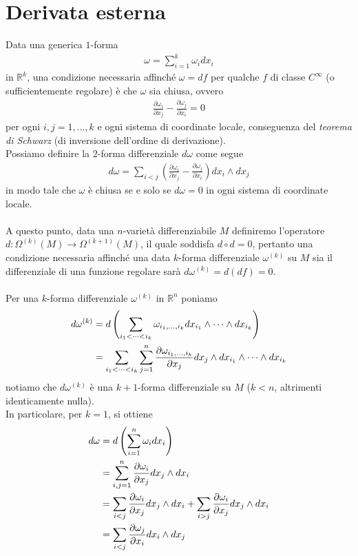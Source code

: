 \documentclass[twoside, 11pt]{amsbook}
\newcommand{\0}{{(0)}}
\newcommand{\3}{{(3)}}
\theoremstyle{colonplain}
\theoremstyle{colondefinition}
\theoremstyle{colonremark}
\numberwithin{equation}{chapter}
\begin{document}
\section{Derivata esterna}
Data una generica $1$-forma 
\begin{align}
    \omega = \sum_{i = 1}^k \omega_i dx_i
\end{align}
in $\mathbb{R}^k$, una condizione necessaria affinché $\omega = df$ per qualche $f$ di classe $C^\infty$ (o sufficientemente regolare) è che $\omega$ sia chiusa, ovvero
\begin{align}
    \frac{\partial \omega_i}{\partial x_j} - \frac{\partial \omega_j}{\partial x_i} = 0
\end{align}
per ogni $i, j = 1, \dots, k$ e ogni sistema di coordinate locale, conseguenza del \textit{teorema di Schwarz} (di inversione dell'ordine di derivazione). \\
Possiamo definire la $2$-forma differenziale $d\omega$ come segue
\begin{align}
    d\omega = \sum_{i < j} \left(\frac{\partial \omega_i}{\partial x_j} - \frac{\partial \omega_j}{\partial x_i}\right)dx_i \wedge dx_j
\end{align}
in modo tale che $\omega$ è chiusa se e solo se $d\omega = 0$ in ogni sistema di coordinate locale. \\ \\
A questo punto, data una $n$-varietà differenziabile $M$ definiremo l'operatore $d : \Omega^{(k)}(M) \longrightarrow \Omega^{(k + 1)}(M)$, il quale soddisfa $d \circ d = 0$, pertanto una condizione necessaria affinché una data $k$-forma differenziale $\omega^{(k)}$ su $M$ sia il differenziale di una funzione regolare sarà $d\omega^{(k)} = d(df) = 0$. \\ \\
Per una $k$-forma differenziale $\omega^{(k)}$ in $\mathbb{R}^n$ poniamo
\begin{align}\label{ExtDiffInR^n}
    d\omega^{(k)} &= d\left(\sum_{i_1 < \dots < i_k} \omega_{i_1, \dots, i_k}dx_{i_1} \wedge \dots \wedge dx_{i_k}\right) \notag \\
    &= \sum_{i_1 < \dots < i_k}\sum_{j = 1}^n \frac{\partial \omega_{i_1, \dots, i_k}}{\partial x_j}dx_j \wedge dx_{i_1} \wedge \dots \wedge dx_{i_k}
\end{align}
notiamo che $d\omega^{(k)}$ è una $k + 1$-forma differenziale su $M$ ($k < n$, altrimenti identicamente nulla). \\
In particolare, per $k = 1$, si ottiene
\begin{align}
    d\omega &= d\left(\sum_{i = 1}^n \omega_i dx_i\right) \notag \\
    &= \sum_{i, j = 1}^n \frac{\partial \omega_i}{\partial x_j}dx_j \wedge dx_i \notag \\
    &= \sum_{i < j}\frac{\partial \omega_i}{\partial x_j}dx_j \wedge dx_i + \sum_{i > j}\frac{\partial \omega_i}{\partial x_j}dx_j \wedge dx_i \notag \\
    &= \sum_{i < j}\frac{\partial \omega_j}{\partial x_i}dx_i \wedge dx_j
\end{align}
\end{document}
